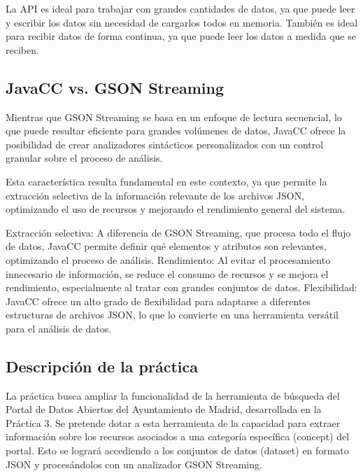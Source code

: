 La API es ideal para trabajar con grandes cantidades de datos, ya que puede leer y escribir los datos sin necesidad de cargarlos todos en memoria. También es ideal para recibir datos de forma continua, ya que puede leer los datos a medida que se reciben.


\subsection{JavaCC vs. GSON Streaming}

Mientras que GSON Streaming se basa en un enfoque de lectura secuencial, lo que puede resultar eficiente para grandes volúmenes de datos, JavaCC ofrece la posibilidad de crear analizadores sintácticos personalizados con un control granular sobre el proceso de análisis.

Esta característica resulta fundamental en este contexto, ya que permite la extracción selectiva de la información relevante de los archivos JSON, optimizando el uso de recursos y mejorando el rendimiento general del sistema.

Extracción selectiva: A diferencia de GSON Streaming, que procesa todo el flujo de datos, JavaCC permite definir qué elementos y atributos son relevantes, optimizando el proceso de análisis.
Rendimiento: Al evitar el procesamiento innecesario de información, se reduce el consumo de recursos y se mejora el rendimiento, especialmente al tratar con grandes conjuntos de datos.
Flexibilidad: JavaCC ofrece un alto grado de flexibilidad para adaptarse a diferentes estructuras de archivos JSON, lo que lo convierte en una herramienta versátil para el análisis de datos.

\subsection{Descripción de la práctica}

\noindent La práctica busca ampliar la funcionalidad de la herramienta de búsqueda del Portal de Datos Abiertos del Ayuntamiento de Madrid, desarrollada en la Práctica 3. Se pretende dotar a esta herramienta de la capacidad para extraer información sobre los recursos asociados a una categoría específica (concept) del portal. Esto se logrará accediendo a los conjuntos de datos (dataset) en formato JSON y procesándolos con un analizador GSON Streaming.


